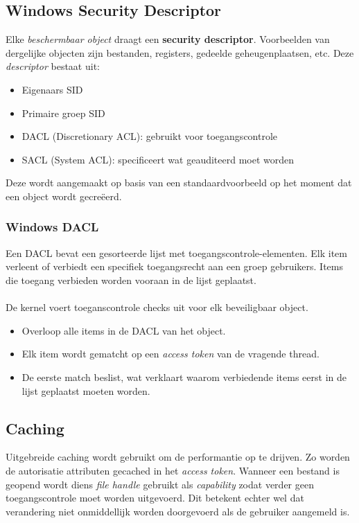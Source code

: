 \documentclass[../main.tex]{subfiles}
\begin{document}
\subsection{Windows Security Descriptor}
Elke \textit{beschermbaar object} draagt een \textbf{security descriptor}. Voorbeelden van dergelijke objecten zijn bestanden, registers, gedeelde geheugenplaatsen, etc. Deze \textit{descriptor} bestaat uit:
\begin{itemize}
	\item Eigenaars SID
	\item Primaire groep SID
	\item DACL (Discretionary ACL): gebruikt voor toegangscontrole
	\item SACL (System ACL): specificeert wat geauditeerd moet worden
\end{itemize}
Deze wordt aangemaakt op basis van een standaardvoorbeeld op het moment dat een object wordt gecreëerd. 

\subsubsection{Windows DACL}
Een DACL bevat een gesorteerde lijst met toegangscontrole-elementen. Elk item verleent of verbiedt een specifiek toegangsrecht aan een groep gebruikers. Items die toegang verbieden worden vooraan in de lijst geplaatst.
\\\\
De kernel voert toeganscontrole checks uit voor elk beveiligbaar object.
\begin{itemize}
	\item Overloop alle items in de DACL van het object.
	\item Elk item wordt gematcht op een \textit{access token} van de vragende thread.
	\item De eerste match beslist, wat verklaart waarom verbiedende items eerst in de lijst geplaatst moeten worden.
\end{itemize}

\subsection{Caching}
Uitgebreide caching wordt gebruikt om de performantie op te drijven. Zo worden de autorisatie attributen gecached in het \textit{access token}. Wanneer een bestand is geopend wordt diens \textit{file handle} gebruikt als \textit{capability} zodat verder geen toegangscontrole moet worden uitgevoerd. Dit betekent echter wel dat verandering niet onmiddellijk worden doorgevoerd als de gebruiker aangemeld is.
\end{document}
